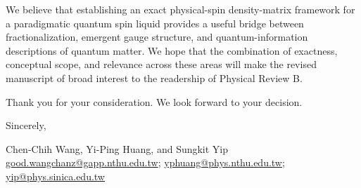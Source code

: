 \documentclass[12pt]{article}
\newcommand{\alert}[1]{{\color{red}#1}}
\begin{document}
We believe that establishing an exact physical-spin density-matrix framework for a paradigmatic quantum spin liquid provides a useful bridge between fractionalization, emergent gauge structure, and quantum-information descriptions of quantum matter. We hope that the combination of exactness, conceptual scope, and relevance across these areas will make the revised manuscript of broad interest to the readership of Physical Review B.

Thank you for your consideration. We look forward to your decision.


\vfill
\begin{flushleft}
Sincerely,
\bigskip

Chen-Chih Wang, Yi-Ping Huang, and Sungkit Yip \\

\href{mailto:good.wangchanz@gapp.nthu.edu.tw}{good.wangchanz@gapp.nthu.edu.tw}; \href{mailto:yphuang@phys.nthu.edu.tw}{yphuang@phys.nthu.edu.tw}; \href{mailto:yip@phys.sinica.edu.tw}{yip@phys.sinica.edu.tw}
\end{flushleft}






\end{document}
